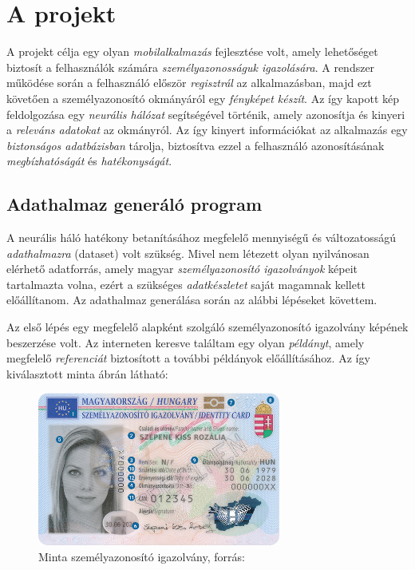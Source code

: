 \documentclass[
]{thesis-ekf}
\theoremstyle{definition}
\theoremstyle{remark}
\begin{document}
\chapter{A projekt}
A projekt célja egy olyan \emph{mobilalkalmazás} fejlesztése volt, amely lehetőséget biztosít a felhasználók számára \emph{személyazonosságuk igazolására}. A rendszer működése során a felhasználó először \emph{regisztrál} az alkalmazásban, majd ezt követően a személyazonosító okmányáról egy \emph{fényképet készít}. Az így kapott kép feldolgozása egy \emph{neurális hálózat} segítségével történik, amely azonosítja és kinyeri a \emph{releváns adatokat} az okmányról. Az így kinyert információkat az alkalmazás egy \emph{biztonságos adatbázisban} tárolja, biztosítva ezzel a felhasználó azonosításának \emph{megbízhatóságát} és \emph{hatékonyságát}.

\section{Adathalmaz generáló program}\label{dataset}
A neurális háló hatékony betanításához megfelelő mennyiségű és változatosságú \emph{adathalmazra} (dataset) volt szükség. Mivel nem létezett olyan nyilvánosan elérhető adatforrás, amely magyar \emph{személyazonosító igazolványok} képeit tartalmazta volna, ezért a szükséges \emph{adatkészletet} saját magamnak kellett előállítanom. Az adathalmaz generálása során az alábbi lépéseket követtem.

Az első lépés egy megfelelő alapként szolgáló személyazonosító igazolvány képének beszerzése volt. Az interneten keresve találtam egy olyan \emph{példányt}, amely megfelelő \emph{referenciát} biztosított a további példányok előállításához. Az így kiválasztott minta  ábrán látható:

\FloatBarrier \begin{figure}[H] \centering \includegraphics[width=8cm]{eszemelyi-front} \caption{Minta személyazonosító igazolvány, forrás: \cite{eszemelyiImage} } \label{fig-eszemelyi} \end{figure}
\end{document}
